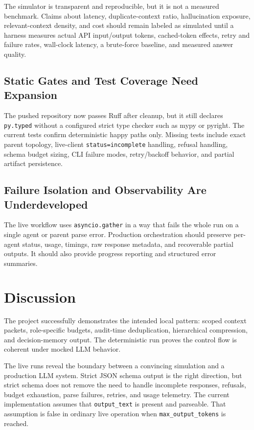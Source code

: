 \documentclass[11pt]{article}
\begin{document}
The simulator is transparent and reproducible, but it is not a measured benchmark. Claims about latency, duplicate-context ratio, hallucination exposure, relevant-context density, and cost should remain labeled as simulated until a harness measures actual API input/output tokens, cached-token effects, retry and failure rates, wall-clock latency, a brute-force baseline, and measured answer quality.

\subsection{Static Gates and Test Coverage Need Expansion}

The pushed repository now passes Ruff after cleanup, but it still declares \texttt{py.typed} without a configured strict type checker such as mypy or pyright. The current tests confirm deterministic happy paths only. Missing tests include exact parent topology, live-client \texttt{status=incomplete} handling, refusal handling, schema budget sizing, CLI failure modes, retry/backoff behavior, and partial artifact persistence.

\subsection{Failure Isolation and Observability Are Underdeveloped}

The live workflow uses \texttt{asyncio.gather} in a way that fails the whole run on a single agent or parent parse error. Production orchestration should preserve per-agent status, usage, timings, raw response metadata, and recoverable partial outputs. It should also provide progress reporting and structured error summaries.

\section{Discussion}

The project successfully demonstrates the intended local pattern: scoped context packets, role-specific budgets, audit-time deduplication, hierarchical compression, and decision-memory output. The deterministic run proves the control flow is coherent under mocked LLM behavior.

The live runs reveal the boundary between a convincing simulation and a production LLM system. Strict JSON schema output is the right direction, but strict schema does not remove the need to handle incomplete responses, refusals, budget exhaustion, parse failures, retries, and usage telemetry. The current implementation assumes that \texttt{output\_text} is present and parseable. That assumption is false in ordinary live operation when \texttt{max\_output\_tokens} is reached.
\end{document}
